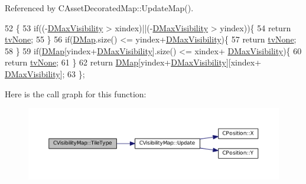 Referenced by C\+Asset\+Decorated\+Map\+::\+Update\+Map().


\begin{DoxyCode}
52                                                               \{
53             \textcolor{keywordflow}{if}((-\hyperlink{classCVisibilityMap_ac8f71b9541c903fce0294d75daa1bbb1}{DMaxVisibility} > xindex)||(-\hyperlink{classCVisibilityMap_ac8f71b9541c903fce0294d75daa1bbb1}{DMaxVisibility} > yindex))\{
54                 \textcolor{keywordflow}{return} \hyperlink{classCVisibilityMap_a6665f905da08825adbb0eee7bd1f2f30aec106086bdc6328c8c6c02ee1bf32d2c}{tvNone};    
55             \}
56             \textcolor{keywordflow}{if}(\hyperlink{classCVisibilityMap_ad217bc34f7a50dd357a3eeeb69cfdd85}{DMap}.size() <= yindex+\hyperlink{classCVisibilityMap_ac8f71b9541c903fce0294d75daa1bbb1}{DMaxVisibility})\{
57                 \textcolor{keywordflow}{return} \hyperlink{classCVisibilityMap_a6665f905da08825adbb0eee7bd1f2f30aec106086bdc6328c8c6c02ee1bf32d2c}{tvNone};   
58             \}
59             \textcolor{keywordflow}{if}(\hyperlink{classCVisibilityMap_ad217bc34f7a50dd357a3eeeb69cfdd85}{DMap}[yindex+\hyperlink{classCVisibilityMap_ac8f71b9541c903fce0294d75daa1bbb1}{DMaxVisibility}].size() <= xindex+
      \hyperlink{classCVisibilityMap_ac8f71b9541c903fce0294d75daa1bbb1}{DMaxVisibility})\{
60                 \textcolor{keywordflow}{return} \hyperlink{classCVisibilityMap_a6665f905da08825adbb0eee7bd1f2f30aec106086bdc6328c8c6c02ee1bf32d2c}{tvNone};   
61             \}
62             \textcolor{keywordflow}{return} \hyperlink{classCVisibilityMap_ad217bc34f7a50dd357a3eeeb69cfdd85}{DMap}[yindex+\hyperlink{classCVisibilityMap_ac8f71b9541c903fce0294d75daa1bbb1}{DMaxVisibility}][xindex+
      \hyperlink{classCVisibilityMap_ac8f71b9541c903fce0294d75daa1bbb1}{DMaxVisibility}];
63         \};
\end{DoxyCode}
Here is the call graph for this function\+:\nopagebreak
\begin{figure}[H]
\begin{center}
\leavevmode
\includegraphics[width=350pt]{classCVisibilityMap_a8517fe52114dd469093fd1bd13482733_cgraph}
\end{center}
\end{figure}
